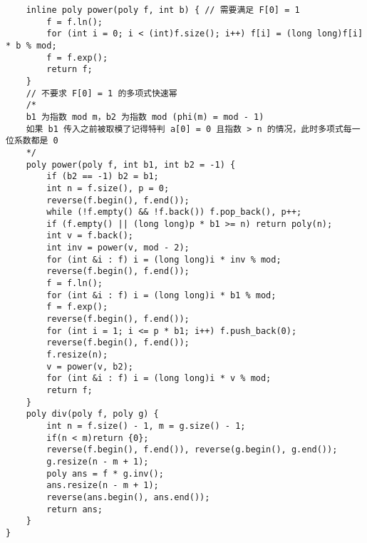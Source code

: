 \begin{verbatim}
    inline poly power(poly f, int b) { // 需要满足 F[0] = 1
        f = f.ln();
        for (int i = 0; i < (int)f.size(); i++) f[i] = (long long)f[i] * b % mod;
        f = f.exp();
        return f;
    }
    // 不要求 F[0] = 1 的多项式快速幂
    /*
    b1 为指数 mod m，b2 为指数 mod (phi(m) = mod - 1)
    如果 b1 传入之前被取模了记得特判 a[0] = 0 且指数 > n 的情况，此时多项式每一位系数都是 0
    */
    poly power(poly f, int b1, int b2 = -1) {
        if (b2 == -1) b2 = b1;
        int n = f.size(), p = 0;
        reverse(f.begin(), f.end());
        while (!f.empty() && !f.back()) f.pop_back(), p++;
        if (f.empty() || (long long)p * b1 >= n) return poly(n);
        int v = f.back();
        int inv = power(v, mod - 2);
        for (int &i : f) i = (long long)i * inv % mod;
        reverse(f.begin(), f.end());
        f = f.ln();
        for (int &i : f) i = (long long)i * b1 % mod;
        f = f.exp();
        reverse(f.begin(), f.end());
        for (int i = 1; i <= p * b1; i++) f.push_back(0);
        reverse(f.begin(), f.end());
        f.resize(n);
        v = power(v, b2);
        for (int &i : f) i = (long long)i * v % mod;
        return f;
    }
    poly div(poly f, poly g) {
        int n = f.size() - 1, m = g.size() - 1;
        if(n < m)return {0};
        reverse(f.begin(), f.end()), reverse(g.begin(), g.end());
        g.resize(n - m + 1);
        poly ans = f * g.inv();
        ans.resize(n - m + 1);
        reverse(ans.begin(), ans.end());
        return ans;
    }
}
\end{verbatim}